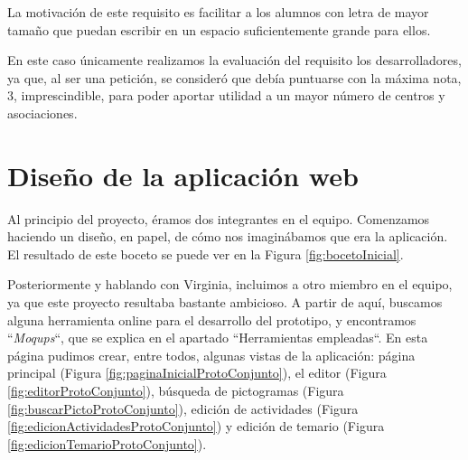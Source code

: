 La motivaci\'on de este requisito es facilitar a los alumnos con letra de mayor tama\~{n}o que puedan escribir en un espacio suficientemente grande para ellos.

En este caso \'unicamente realizamos la evaluaci\'on del requisito los desarrolladores, ya que, al ser una petici\'on, se consider\'o que deb\'ia puntuarse con la m\'axima nota, 3, imprescindible, para poder aportar utilidad a un mayor n\'umero de centros y asociaciones.

\begin{table}
\centering
{}
\caption{Puntuaci\'on de los requisitos de formato.}
\end{table}

\section{Dise\~{n}o de la aplicaci\'on web}
\label{cap5:sec:diseno_app_web}

	Al principio del proyecto, \'eramos dos integrantes en el equipo. Comenzamos haciendo un dise\~{n}o, en papel, de c\'omo nos imagin\'abamos que era la aplicaci\'on. El resultado de este boceto se puede ver en la Figura \ref{fig:bocetoInicial}.
	
	
	Posteriormente y hablando con Virginia, incluimos a otro miembro en el equipo, ya que este proyecto resultaba bastante ambicioso. A partir de aqu\'i, buscamos alguna herramienta online para el desarrollo del prototipo, y encontramos ``\textit{Moqups}``, que se explica en el apartado ``Herramientas empleadas``. En esta p\'agina pudimos crear, entre todos, algunas vistas de la aplicaci\'on: p\'agina principal (Figura \ref{fig:paginaInicialProtoConjunto}), el editor (Figura \ref{fig:editorProtoConjunto}), b\'usqueda de pictogramas (Figura \ref{fig:buscarPictoProtoConjunto}), edici\'on de actividades (Figura \ref{fig:edicionActividadesProtoConjunto}) y edici\'on de temario (Figura \ref{fig:edicionTemarioProtoConjunto}).
	
